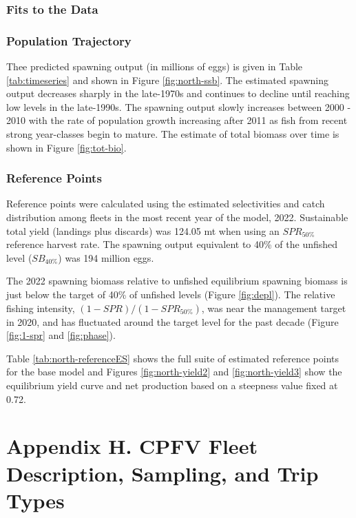 \documentclass[11pt,
  english,
  letterpaper,
]{article}
\begin{document}
\hypertarget{fits-to-the-data}{%
\subsubsection{Fits to the Data}\label{fits-to-the-data}}

\hypertarget{population-trajectory}{%
\subsubsection{Population Trajectory}\label{population-trajectory}}

Thee predicted spawning output (in millions of eggs) is given in Table \ref{tab:timeseries} and shown in Figure \ref{fig:north-ssb}. The estimated spawning output decreases sharply in the late-1970s and continues to decline until reaching low levels in the late-1990s. The spawning output slowly increases between 2000 - 2010 with the rate of population growth increasing after 2011 as fish from recent strong year-classes begin to mature. The estimate of total biomass over time is shown in Figure \ref{fig:tot-bio}.

\hypertarget{reference-points}{%
\subsubsection{Reference Points}\label{reference-points}}

Reference points were calculated using the estimated selectivities and catch distribution among fleets in the most recent year of the model, 2022. Sustainable total yield (landings plus discards) was 124.05 mt when using an \(SPR_{50\%}\) reference harvest rate. The spawning output equivalent to 40\% of the unfished level (\(SB_{40\%}\)) was 194 million eggs.

The 2022 spawning biomass relative to unfished equilibrium spawning biomass is just below the target of 40\% of unfished levels (Figure \ref{fig:depl}). The relative fishing intensity, \((1-SPR)/(1-SPR_{50\%})\), was near the management target in 2020, and has fluctuated around the target level for the past decade (Figure \ref{fig:1-spr} and \ref{fig:phase}).

Table \ref{tab:north-referenceES} shows the full suite of estimated reference points for the base model and Figures \ref{fig:north-yield2} and \ref{fig:north-yield3} show the equilibrium yield curve and net production based on a steepness value fixed at 0.72.

\hypertarget{cpfv-samples}{%
\section{Appendix H. CPFV Fleet Description, Sampling, and Trip Types}\label{cpfv-samples}}
\end{document}
